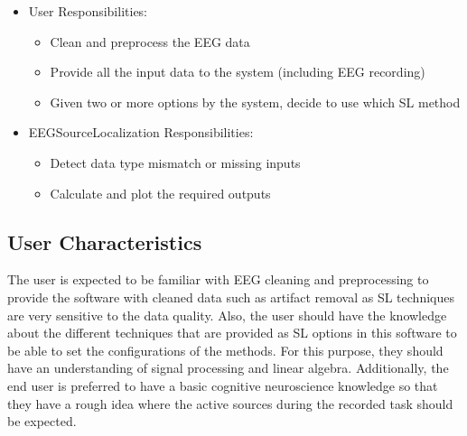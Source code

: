 \documentclass[12pt]{article}
\renewcommand{\progname}{EEGSourceLocalization}
\begin{document}
\begin{itemize}
\item User Responsibilities:
\begin{itemize} 
\item  Clean and preprocess the EEG data
\item  Provide all the input data to the system (including EEG recording)
\item  Given two or more options by the system, decide to use which SL method
\end{itemize}

\item \progname{} Responsibilities:
\begin{itemize}
\item Detect data type mismatch or missing inputs
\item Calculate and plot the required outputs
\end{itemize}
\end{itemize}

\subsection{User Characteristics} \label{SecUserCharacteristics}

The user is expected to be familiar with EEG cleaning and preprocessing to provide the software with cleaned data such as artifact removal as SL techniques are very sensitive to the data quality. Also, the user should have the knowledge about the different techniques that are provided as SL options in this software to be able to set the configurations of the methods. For this purpose, they should have an understanding of signal processing and linear algebra. Additionally, the end user is preferred to have a basic cognitive neuroscience knowledge so that they have a rough idea where the active sources during the recorded task should be expected. 

\end{document}
